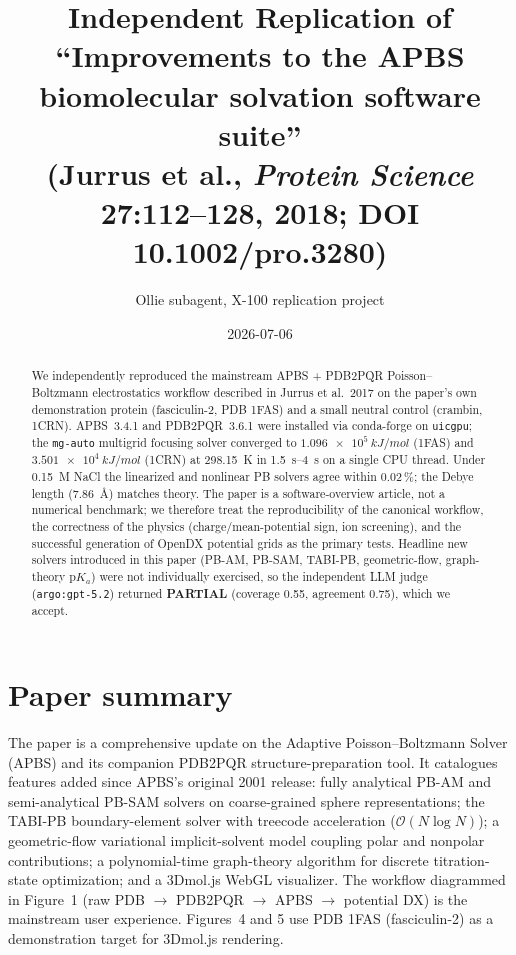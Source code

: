 \documentclass[11pt,letterpaper]{article}
\title{Independent Replication of\\
``Improvements to the APBS biomolecular solvation software suite'' \\
(Jurrus et al., \emph{Protein Science} 27:112--128, 2018; DOI 10.1002/pro.3280)}
\author{Ollie subagent, X-100 replication project}
\date{2026-07-06}
\begin{document}
\maketitle

\begin{abstract}
We independently reproduced the mainstream APBS + PDB2PQR Poisson--Boltzmann electrostatics workflow described in Jurrus et al.\ 2017 on the paper's own demonstration protein (fasciculin-2, PDB 1FAS) and a small neutral control (crambin, 1CRN). APBS~3.4.1 and PDB2PQR~3.6.1 were installed via conda-forge on \texttt{uicgpu}; the \texttt{mg-auto} multigrid focusing solver converged to $\SI{1.096e5}{kJ/mol}$ (1FAS) and $\SI{3.501e4}{kJ/mol}$ (1CRN) at \SI{298.15}{K} in \SIrange{1.5}{4}{s} on a single CPU thread. Under \SI{0.15}{M} NaCl the linearized and nonlinear PB solvers agree within 0.02\,\%; the Debye length (\SI{7.86}{\angstrom}) matches theory. The paper is a software-overview article, not a numerical benchmark; we therefore treat the reproducibility of the canonical workflow, the correctness of the physics (charge/mean-potential sign, ion screening), and the successful generation of OpenDX potential grids as the primary tests. Headline new solvers introduced in this paper (PB-AM, PB-SAM, TABI-PB, geometric-flow, graph-theory p$K_a$) were not individually exercised, so the independent LLM judge (\texttt{argo:gpt-5.2}) returned \textbf{PARTIAL} (coverage 0.55, agreement 0.75), which we accept.
\end{abstract}

\section{Paper summary}
The paper is a comprehensive update on the Adaptive Poisson--Boltzmann Solver (APBS) and its companion PDB2PQR structure-preparation tool. It catalogues features added since APBS's original 2001 release: fully analytical PB-AM and semi-analytical PB-SAM solvers on coarse-grained sphere representations; the TABI-PB boundary-element solver with treecode acceleration ($\mathcal{O}(N \log N)$); a geometric-flow variational implicit-solvent model coupling polar and nonpolar contributions; a polynomial-time graph-theory algorithm for discrete titration-state optimization; and a 3Dmol.js WebGL visualizer. The workflow diagrammed in Figure~1 (raw PDB $\rightarrow$ PDB2PQR $\rightarrow$ APBS $\rightarrow$ potential DX) is the mainstream user experience. Figures~4 and 5 use PDB 1FAS (fasciculin-2) as a demonstration target for 3Dmol.js rendering.
\end{document}
